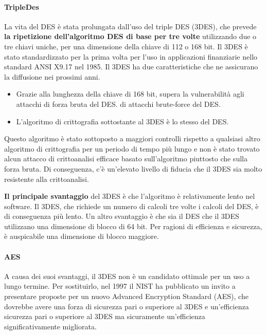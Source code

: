 \singlespacing

\paragraph{TripleDes} La vita del DES è stata prolungata dall'uso del triple DES (3DES), che prevede \textbf{la ripetizione dell'algoritmo DES di base per tre volte} utilizzando due o tre chiavi uniche, per una dimensione della chiave di 112 o 168 bit. Il 3DES è stato standardizzato per la prima volta per l'uso in applicazioni finanziarie nello standard ANSI X9.17 nel 1985. Il 3DES ha due caratteristiche che ne assicurano la diffusione nei prossimi anni.

\begin{itemize}
    \item Grazie alla lunghezza della chiave di 168 bit, supera la vulnerabilità agli attacchi di forza bruta del DES. di attacchi brute-force del DES. 
    
    \item L'algoritmo di crittografia sottostante al 3DES è lo stesso del DES.
\end{itemize}

Questo algoritmo è stato sottoposto a maggiori controlli rispetto a qualsiasi altro algoritmo di crittografia per un periodo di tempo più lungo e non è stato trovato alcun attacco di crittoanalisi efficace basato sull'algoritmo piuttosto che sulla forza bruta. Di conseguenza, c'è un'elevato livello di fiducia che il 3DES sia molto resistente alla crittoanalisi.

\singlespacing

\textbf{Il principale svantaggio} del 3DES è che l'algoritmo è relativamente lento nel software. Il 3DES, che richiede un numero di calcoli tre volte i calcoli del DES, è di conseguenza più lento. Un altro svantaggio è che sia il DES che il 3DES utilizzano una dimensione di blocco di 64 bit. Per ragioni di efficienza e sicurezza, è auspicabile una dimensione di blocco maggiore.

\singlespacing

\paragraph{AES} A causa dei suoi svantaggi, il 3DES non è un candidato ottimale per un uso a lungo termine.
Per sostituirlo, nel 1997 il NIST ha pubblicato un invito a presentare proposte per un nuovo Advanced Encryption Standard (AES), che dovrebbe avere una forza di sicurezza pari o superiore al 3DES e un'efficienza sicurezza pari o superiore al 3DES ma sicuramente un'efficienza significativamente migliorata.

